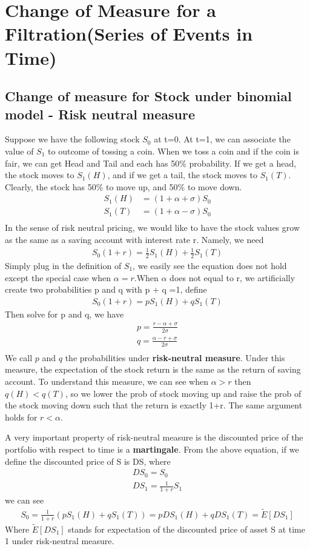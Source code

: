 \documentclass[a4paper]{article}
\begin{document}
\section{Change of Measure for a Filtration(Series of Events in Time)}
\subsection{Change of measure for Stock under binomial model - Risk neutral measure}
Suppose we have the following stock $S_0$ at t=0. At t=1, we can associate the value of $S_1$ to outcome of tossing a coin. When we toss a coin and if the coin is fair, we can get Head and Tail and each has 50\% probability. If we get a head, the stock moves to $S_1(H)$, and if we get a tail, the stock moves to $S_1(T)$. Clearly, the stock has 50\% to move up, and 50\% to move down.
\begin{align*}
S_1(H) & = (1+\alpha + \sigma) S_0\\  
S_1(T) & = (1+\alpha - \sigma) S_0\\     
\end{align*}
In the sense of risk neutral pricing, we would like to have the stock values grow as the same as a saving account with interest rate r.  Namely, we need
\begin{align*}
S_0 (1+r) = \frac{1}{2}S_1(H) + \frac{1}{2} S_1(T) 
\end{align*}
Simply plug in the definition of $S_1$, we easily see the equation does not hold except the special case when $\alpha = r$.When $\alpha$ does not equal to r, we artificially create two probabilities p and q with p + q =1, 
define 
\begin{align*}
S_0 (1+r) = p S_1(H) + q S_1(T) 	
\end{align*}
Then solve for p and q, we have
\begin{align*}
p= \frac{r - \alpha + \sigma}{2 \sigma} \\
q= \frac{\alpha - r + \sigma}{2 \sigma} \\
\end{align*}
We call $p$ and $q$ the probabilities under {\bf risk-neutral measure}. Under this measure, the expectation of the stock return is the same as the return of saving account. To understand this measure, we can see when $\alpha > r$ then $q(H)< q(T)$, so we lower the prob of stock moving up and raise the prob of the stock moving down such that the return is exactly 1+r. The same argument holds for $r < \alpha$. 

A very important property of risk-neutral measure is the discounted price of the portfolio with respect to time is a {\bf martingale}. From the above equation, if we define the discounted price of S is DS, where 
\begin{align*}
DS_0 = S_0\\
DS_1 = \frac{1}{1+r} S_1
\end{align*}
we can see
\begin{align*}
S_0 = \frac{1}{1+r} (p S_1(H) + q S_1(T)) = p DS_1(H) + q DS_1(T) = \tilde E[DS_1]
\end{align*}
Where $\tilde E[DS_1]$ stands for expectation of the discounted price of asset S at time 1 under risk-neutral measure.\\
\end{document}
